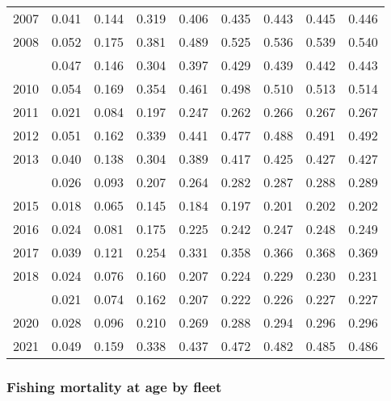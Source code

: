 \documentclass[
]{article}
\begin{document}
\begin{longtable}[t]{lrrrrrrrr}
2007 & 0.041 & 0.144 & 0.319 & 0.406 & 0.435 & 0.443 & 0.445 & 0.446\\
2008 & 0.052 & 0.175 & 0.381 & 0.489 & 0.525 & 0.536 & 0.539 & 0.540\\
\addlinespace
2009 & 0.047 & 0.146 & 0.304 & 0.397 & 0.429 & 0.439 & 0.442 & 0.443\\
2010 & 0.054 & 0.169 & 0.354 & 0.461 & 0.498 & 0.510 & 0.513 & 0.514\\
2011 & 0.021 & 0.084 & 0.197 & 0.247 & 0.262 & 0.266 & 0.267 & 0.267\\
2012 & 0.051 & 0.162 & 0.339 & 0.441 & 0.477 & 0.488 & 0.491 & 0.492\\
2013 & 0.040 & 0.138 & 0.304 & 0.389 & 0.417 & 0.425 & 0.427 & 0.427\\
\addlinespace
2014 & 0.026 & 0.093 & 0.207 & 0.264 & 0.282 & 0.287 & 0.288 & 0.289\\
2015 & 0.018 & 0.065 & 0.145 & 0.184 & 0.197 & 0.201 & 0.202 & 0.202\\
2016 & 0.024 & 0.081 & 0.175 & 0.225 & 0.242 & 0.247 & 0.248 & 0.249\\
2017 & 0.039 & 0.121 & 0.254 & 0.331 & 0.358 & 0.366 & 0.368 & 0.369\\
2018 & 0.024 & 0.076 & 0.160 & 0.207 & 0.224 & 0.229 & 0.230 & 0.231\\
\addlinespace
2019 & 0.021 & 0.074 & 0.162 & 0.207 & 0.222 & 0.226 & 0.227 & 0.227\\
2020 & 0.028 & 0.096 & 0.210 & 0.269 & 0.288 & 0.294 & 0.296 & 0.296\\
2021 & 0.049 & 0.159 & 0.338 & 0.437 & 0.472 & 0.482 & 0.485 & 0.486\\*
\end{longtable}

\hypertarget{fishing-mortality-at-age-by-fleet}{%
\subsubsection{Fishing mortality at age by
fleet}\label{fishing-mortality-at-age-by-fleet}}
\end{document}
